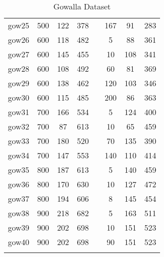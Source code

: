 \begin{table}[H]
\begin{tabular}{cccccccc}
        gow25 & 500 & 122 & 378 & & 167 & 91 & 283\\
        gow26 & 600 & 118 & 482 & & 5 & 88 & 361\\
        gow27 & 600 & 145 & 455 & & 10 & 108 & 341\\
        gow28 & 600 & 108 & 492 & & 60 & 81 & 369\\
        gow29 & 600 & 138 & 462 & & 120 & 103 & 346\\
        gow30 & 600 & 115 & 485 & & 200 & 86 & 363\\
        gow31 & 700 & 166 & 534 & & 5 & 124 & 400\\
        gow32 & 700 & 87 & 613 & & 10 & 65 & 459\\
        gow33 & 700 & 180 & 520 & & 70 & 135 & 390\\
        gow34 & 700 & 147 & 553 & & 140 & 110 & 414\\
        gow35 & 800 & 187 & 613 & & 5 & 140 & 459\\
        gow36 & 800 & 170 & 630 & & 10 & 127 & 472\\
        gow37 & 800 & 194 & 606 & & 8 & 145 & 454\\
        gow38 & 900 & 218 & 682 & & 5 & 163 & 511\\
        gow39 & 900 & 202 & 698 & & 10 & 151 & 523\\
        gow40 & 900 & 202 & 698 & & 90 & 151 & 523\\

        \lasthline
    \end{tabular}
    \caption{Gowalla Dataset}
    \label{tab:gowalla_dataset}
    \normalsize
\end{table}